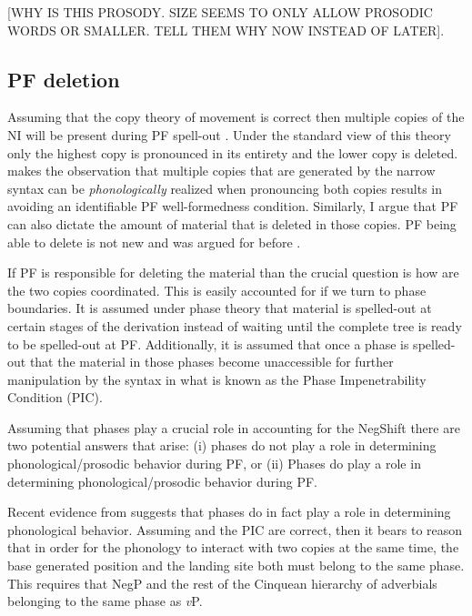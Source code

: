 \documentclass[12pt, letterpaper]{article}
\begin{document}
[WHY IS THIS PROSODY. SIZE SEEMS TO ONLY ALLOW PROSODIC WORDS OR SMALLER. TELL THEM WHY NOW INSTEAD OF LATER].
\subsection{PF deletion} \label{sec:NEXT}

Assuming that the copy theory of movement is correct then multiple copies of the NI will be present during PF spell-out \citep{chomskyMinimalistProgramLinguistic1993}. Under the standard view of this theory only the highest copy is pronounced in its entirety and the lower copy is deleted. \citet{kandybowiczGrammarRepetitionNupe2008} makes the observation that multiple copies that are generated by the narrow syntax can be \emph{phonologically} realized when pronouncing both copies results in avoiding an identifiable PF well-formedness condition. Similarly, I argue that PF can also dictate the amount of material that is deleted in those copies. PF being able to delete is not new and was argued for before \citep{chomskyTheoryPrinciplesParameters1993,merchantSyntaxSilenceSluicing2001,foxSuccessiveCyclicMovementIsland2003,ottDeletionClausalEllipsis2016}. 

If PF is responsible for deleting the material than the crucial question is how are the two copies coordinated. This is easily accounted for if we turn to phase boundaries. It is assumed under phase theory \citep{chomskyDerivationPhase2001,chomskyPhases2008} that material is spelled-out at certain stages of the derivation instead of waiting until the complete tree is ready to be spelled-out at PF. Additionally, it is assumed that once a phase is spelled-out that the material in those phases become unaccessible for further manipulation by the syntax in what is known as the Phase Impenetrability Condition (PIC). 

Assuming that phases play a crucial role in accounting for the NegShift there are two potential answers that arise: (i) phases do not play a role in determining phonological/prosodic behavior during PF, or (ii) Phases do play a role in determining phonological/prosodic behavior during PF.

Recent evidence from \citet{weberPhaseBasedConstraints2021} suggests that phases do in fact play a role in determining phonological behavior. Assuming \citeauthor{weberPhaseBasedConstraints2021} and the PIC are correct, then it bears to reason that in order for the phonology to interact with two copies at the same time, the base generated position and the landing site both must belong to the same phase. This requires that NegP and the rest of the Cinquean hierarchy of adverbials \citep{cinqueAdverbsFunctionalHeads1999} belonging to the same phase as \emph{v}P.
\end{document}
